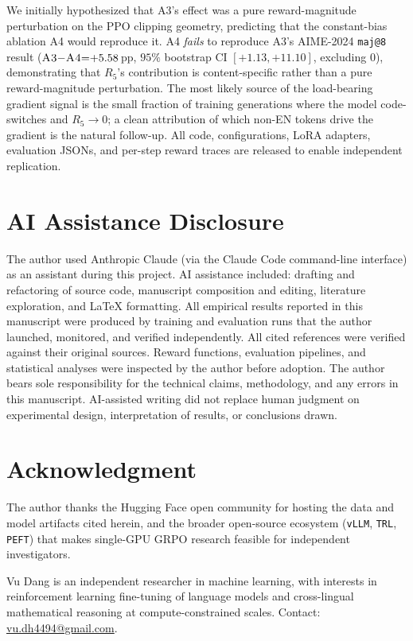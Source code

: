 \documentclass[journal,onecolumn,11pt]{IEEEtran}
\newcommand{\armC}{\textsc{A3}}
\newcommand{\armD}{\textsc{A4}}
\newcommand{\R}[1]{R_{#1}}
\begin{document}
We initially hypothesized that \armC{}'s effect was a pure
reward-magnitude perturbation on the PPO clipping geometry, predicting
that the constant-bias ablation \armD{} would reproduce it. \armD{}
\emph{fails} to reproduce \armC{}'s AIME-2024 \texttt{maj@8} result
($\armC{}{-}\armD{}{=}{+}5.58$\,pp, $95\%$ bootstrap CI
$[+1.13, +11.10]$, excluding $0$), demonstrating that $\R{5}$'s
contribution is content-specific rather than a pure reward-magnitude
perturbation. The most likely source of the load-bearing gradient
signal is the small fraction of training generations where the model
code-switches and $\R{5}\to 0$; a clean attribution of which non-EN
tokens drive the gradient is the natural follow-up. All code,
configurations, LoRA adapters, evaluation JSONs, and per-step reward
traces are released to enable independent replication.

\section*{AI Assistance Disclosure}
The author used Anthropic Claude (via the Claude Code command-line interface)
as an assistant during this project. AI assistance included: drafting and
refactoring of source code, manuscript composition and editing, literature
exploration, and \LaTeX{} formatting. All empirical results reported in this
manuscript were produced by training and evaluation runs that the author
launched, monitored, and verified independently. All cited references were
verified against their original sources. Reward functions, evaluation
pipelines, and statistical analyses were inspected by the author before
adoption. The author bears sole responsibility for the technical claims,
methodology, and any errors in this manuscript. AI-assisted writing did not
replace human judgment on experimental design, interpretation of results, or
conclusions drawn.

\section*{Acknowledgment}
The author thanks the Hugging Face open community for hosting the data and
model artifacts cited herein, and the broader open-source ecosystem
(\texttt{vLLM}, \texttt{TRL}, \texttt{PEFT}) that makes single-GPU GRPO
research feasible for independent investigators.




\vspace{4pt}
\begin{IEEEbiographynophoto}{Vu Dang}
is an independent researcher in machine learning, with interests in
reinforcement learning fine-tuning of language models and cross-lingual
mathematical reasoning at compute-constrained scales. Contact:
\href{mailto:vu.dh4494@gmail.com}{vu.dh4494@gmail.com}.
\end{IEEEbiographynophoto}
\end{document}
